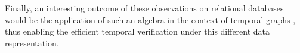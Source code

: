\documentclass[sigconf]{acmart}
\begin{document}
Finally, an interesting outcome of these observations on relational databases would be the application of such an algebra in the context of temporal graphs 
\cite{DBLP:conf/medi/ZakiHH022,DBLP:journals/vldb/RostGTFSCAJR22}, thus enabling the efficient temporal verification under this different data representation. 




%
%
%
\end{document}
